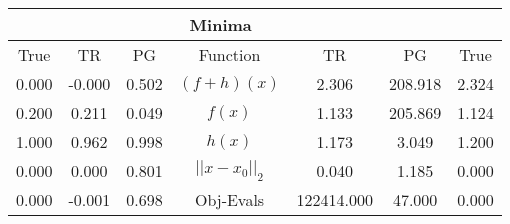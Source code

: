\begin{tabular}{| c |c |c || c |c |c |c |}
    \hline
    \rowcolor[gray]{0.9}
\multicolumn{3}{|c|}{Parameters} & \multicolumn{4}{|c|}{Minima}\\ \hline True & TR & PG  & Function & TR & PG & True \\
    \hline
  \rowcolor[gray]{0.7}
  0.000 & -0.000 & 0.502   & $ (f + h)(x) $ & 2.306 & 208.918 & 2.324 \\
  \rowcolor[gray]{0.8}
  0.200 & 0.211 & 0.049   & $ f(x) $ & 1.133 & 205.869 & 1.124 \\
  \rowcolor[gray]{0.7}
  1.000 & 0.962 & 0.998   & $ h(x) $ & 1.173 & 3.049 & 1.200 \\
  \rowcolor[gray]{0.8}
  0.000 & 0.000 & 0.801   & $ ||x - x_0||_2 $ & 0.040 & 1.185 & 0.000 \\
  \rowcolor[gray]{0.7}
  0.000 & -0.001 & 0.698   & Obj-Evals & 122414.000 & 47.000 & 0.000 \\
\end{tabular}
